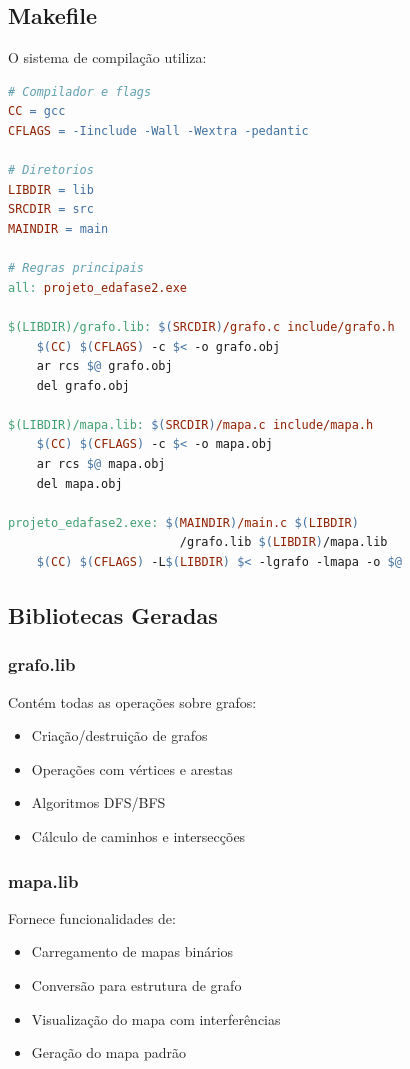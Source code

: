 \documentclass[a4paper,12pt]{report}
\begin{document}
\subsection{Makefile}
O sistema de compilação utiliza:

\begin{lstlisting}[language=make]
# Compilador e flags
CC = gcc
CFLAGS = -Iinclude -Wall -Wextra -pedantic

# Diretorios
LIBDIR = lib
SRCDIR = src
MAINDIR = main

# Regras principais
all: projeto_edafase2.exe

$(LIBDIR)/grafo.lib: $(SRCDIR)/grafo.c include/grafo.h
	$(CC) $(CFLAGS) -c $< -o grafo.obj
	ar rcs $@ grafo.obj
	del grafo.obj

$(LIBDIR)/mapa.lib: $(SRCDIR)/mapa.c include/mapa.h
	$(CC) $(CFLAGS) -c $< -o mapa.obj
	ar rcs $@ mapa.obj
	del mapa.obj

projeto_edafase2.exe: $(MAINDIR)/main.c $(LIBDIR)
                        /grafo.lib $(LIBDIR)/mapa.lib
	$(CC) $(CFLAGS) -L$(LIBDIR) $< -lgrafo -lmapa -o $@
\end{lstlisting}

\subsection{Bibliotecas Geradas}
\subsubsection{grafo.lib}
Contém todas as operações sobre grafos:
\begin{itemize}
    \item Criação/destruição de grafos
    \item Operações com vértices e arestas
    \item Algoritmos DFS/BFS
    \item Cálculo de caminhos e intersecções
\end{itemize}

\subsubsection{mapa.lib}
Fornece funcionalidades de:
\begin{itemize}
    \item Carregamento de mapas binários
    \item Conversão para estrutura de grafo
    \item Visualização do mapa com interferências
    \item Geração do mapa padrão
\end{itemize}
\end{document}
